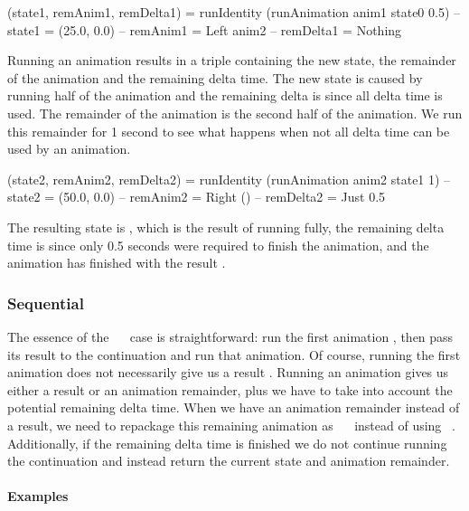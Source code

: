 \begin{code}
(state1, remAnim1, remDelta1) =
  runIdentity (runAnimation anim1 state0 0.5)
-- state1 = (25.0, 0.0)
-- remAnim1 = Left anim2
-- remDelta1 = Nothing
\end{code}

Running an animation results in a triple containing the new state, the remainder of the animation and the remaining delta time. The new state is  caused by running half of the  animation and the remaining delta is  since all delta time is used. The remainder of the animation is the second half of the  animation. We run this remainder for 1 second to see what happens when not all delta time can be used by an animation.

\begin{code}
(state2, remAnim2, remDelta2) =
  runIdentity (runAnimation anim2 state1 1)
-- state2 = (50.0, 0.0)
-- remAnim2 = Right ()
-- remDelta2 = Just 0.5
\end{code}

The resulting state is , which is the result of running  fully, the remaining delta time is  since only 0.5 seconds were required to finish the animation, and the animation has finished with the result \hs{()}.

\subsubsection{Sequential}

The essence of the ~\hs{>>=}~ case is straightforward: run the first animation , then pass its result to the continuation  and run that animation. Of course, running the first animation does not necessarily give us a result . Running an animation gives us either a result or an animation remainder, plus we have to take into account the potential remaining delta time. When we have an animation remainder instead of a result, we need to repackage this remaining animation as ~\hs{>>=}~ instead of using ~. Additionally, if the remaining delta time is finished we do not continue running the continuation and instead return the current state and animation remainder.

\paragraph{Examples}

